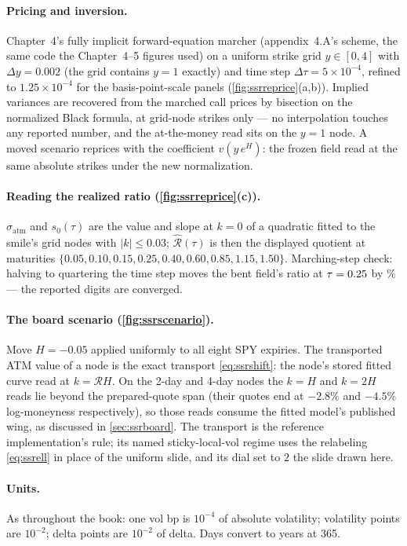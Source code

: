 \paragraph{Pricing and inversion.}
Chapter~4's fully implicit forward-equation marcher (appendix~4.A's
scheme, the same code the Chapter~4--5 figures used) on a uniform
strike grid $y\in[0,4]$ with $\Delta y=0.002$ (the grid contains
$y=1$ exactly) and time step $\Delta\tau=5\times10^{-4}$, refined to
$1.25\times10^{-4}$ for the basis-point-scale panels
(\cref{fig:ssrreprice}(a,b)).  Implied variances are recovered from
the marched call prices by bisection on the normalized Black formula,
at grid-node strikes only --- no interpolation touches any reported
number, and the at-the-money read sits on the $y=1$ node.  A moved
scenario reprices with the coefficient $v(y\,e^{H})$: the frozen
field read at the same absolute strikes under the new normalization.

\paragraph{Reading the realized ratio (\cref{fig:ssrreprice}(c)).}
$\sigma_{\mathrm{atm}}$ and $s_0(\tau)$ are the value and slope at
$k=0$ of a quadratic fitted to the smile's grid nodes with
$\lvert k\rvert\le0.03$; $\widehat{\mathcal{R}}(\tau)$ is then the
displayed quotient at maturities
$\{0.05,0.10,0.15,0.25,0.40,0.60,0.85,1.15,1.50\}$.  Marching-step
check: halving to quartering the time step moves the bent field's
ratio at $\tau=0.25$ by \MacSsrRepAuditPct\% --- the
reported digits are converged.

\paragraph{The board scenario (\cref{fig:ssrscenario}).}
Move $H=-0.05$ applied uniformly to all eight SPY expiries.  The
transported ATM value of a node is the exact transport
\eqref{eq:ssrshift}: the node's stored fitted curve read at
$k=\mathcal{R}H$.  On the 2-day and 4-day nodes the $k=H$ and
$k=2H$ reads lie beyond the prepared-quote span (their quotes end at
$-2.8\%$ and $-4.5\%$ log-moneyness respectively), so those reads
consume the fitted model's published wing, as discussed in
\cref{sec:ssrboard}.  The transport is the reference implementation's
rule; its named sticky-local-vol regime uses the relabeling
\eqref{eq:ssrell} in place of the uniform slide, and its dial set to
$2$ the slide drawn here.

\paragraph{Units.}
As throughout the book: one vol bp is $10^{-4}$ of absolute
volatility; volatility points are $10^{-2}$; delta points are
$10^{-2}$ of delta.  Days convert to years at 365.
